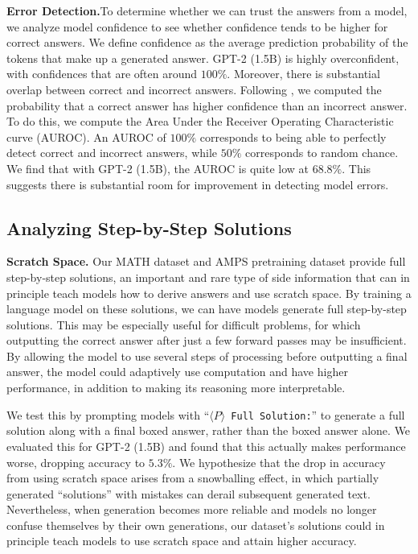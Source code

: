 \textbf{Error Detection.}\quad To determine whether we can trust the answers from a model, we analyze model confidence to see whether confidence tends to be higher for correct answers. We define confidence as the average prediction probability of the tokens that make up a generated answer. GPT-2 (1.5B) is highly overconfident, with confidences that are often around $100\%$. Moreover, there is substantial overlap between correct and incorrect answers. Following \citet{hendrycks17baseline}, we computed the probability that a correct answer has higher confidence than an incorrect answer. To do this, we compute the Area Under the Receiver Operating Characteristic curve (AUROC). An AUROC of $100\%$ corresponds to being able to perfectly detect correct and incorrect answers, while $50\%$ corresponds to random chance. We find that with GPT-2 (1.5B), the AUROC is quite low at $68.8\%$. This suggests there is substantial room for improvement in detecting model errors.

\subsection{Analyzing Step-by-Step Solutions}

\textbf{Scratch Space.}\quad
Our MATH dataset and AMPS pretraining dataset provide full step-by-step solutions, an important and rare type of side information \citep{Murty2020ExpBERTRE} that can in principle teach models how to derive answers and use scratch space. By training a language model on these solutions, we can have models generate full step-by-step solutions. This may be especially useful for difficult problems, for which outputting the correct answer after just a few forward passes may be insufficient. By allowing the model to use several steps of processing before outputting a final answer, the model could adaptively use computation and have higher performance, in addition to making its reasoning more interpretable.

We test this by prompting models with ``\texttt{$\langle P\rangle$ Full Solution:}'' to generate a full solution along with a final boxed answer, rather than the boxed answer alone. We evaluated this for GPT-2 (1.5B) and found that this actually makes performance worse, dropping accuracy to $5.3\%$. We hypothesize that the drop in accuracy from using scratch space arises from a snowballing effect, in which partially generated ``solutions'' with mistakes can derail subsequent generated text. Nevertheless, when generation becomes more reliable and models no longer confuse themselves by their own generations, our dataset's solutions could in principle teach models to use scratch space and attain higher accuracy.


